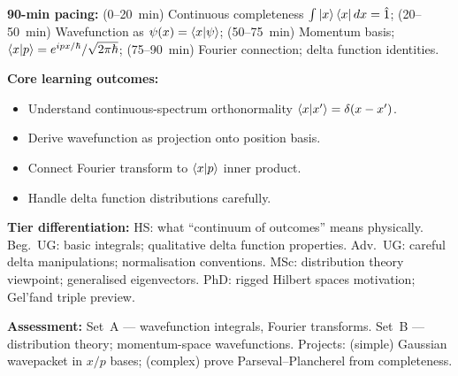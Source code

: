 \documentclass[11pt,a4paper]{article}
\begin{document}
\medskip
\begin{tcolorbox}[modulebox, title={Module~I.2 / L06: Continuous Bases: $\ket{x}$, $\ket{p}$ \& Delta Functions}]
\textbf{90-min pacing:} (0--20~min) Continuous completeness $\int\ket{x}\bra{x}dx=\hat{1}$;
(20--50~min) Wavefunction as $\psi(x)=\braket{x|\psi}$;
(50--75~min) Momentum basis; $\braket{x|p}=e^{ipx/\hbar}/\sqrt{2\pi\hbar}$;
(75--90~min) Fourier connection; delta function identities.

\medskip\textbf{Core learning outcomes:}
\begin{itemize}[leftmargin=1.4em,topsep=2pt,itemsep=1pt]
  \item Understand continuous-spectrum orthonormality $\braket{x|x'}=\delta(x-x')$.
  \item Derive wavefunction as projection onto position basis.
  \item Connect Fourier transform to $\braket{x|p}$ inner product.
  \item Handle delta function distributions carefully.
\end{itemize}

\medskip\textbf{Tier differentiation:}
HS: what ``continuum of outcomes'' means physically.
Beg.\ UG: basic integrals; qualitative delta function properties.
Adv.\ UG: careful delta manipulations; normalisation conventions.
MSc: distribution theory viewpoint; generalised eigenvectors.
PhD: rigged Hilbert spaces motivation; Gel'fand triple preview.

\medskip\textbf{Assessment:}
Set~A --- wavefunction integrals, Fourier transforms.
Set~B --- distribution theory; momentum-space wavefunctions.
Projects: (simple) Gaussian wavepacket in $x/p$ bases; (complex) prove Parseval--Plancherel from completeness.
\end{tcolorbox}
\end{document}
